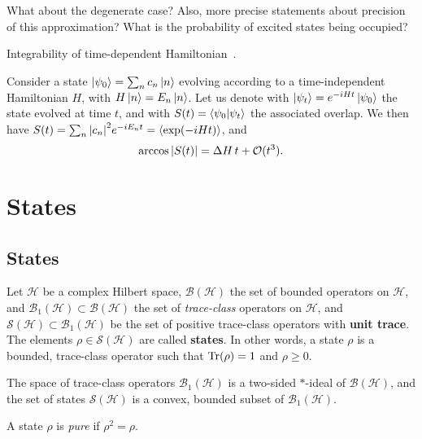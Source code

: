\documentclass[a4paper]{report}
\newcommand{\calB}{{\mathcal{B}}}
\newcommand{\calH}{{\mathcal{H}}}
\newcommand{\calS}{{\mathcal{S}}}
\begin{document}
\begin{question}
	What about the degenerate case? Also, more precise statements about precision of this approximation? What is the probability of excited states being occupied?
\end{question}

Integrability of time-dependent Hamiltonian~\autocite{sinitsyn2018integrable}.

\begin{prop}
	Consider a state $\ket{\psi_0}=\sum_n c_n \ket n$ evolving according to a time-independent Hamiltonian $H$, with $H\ket n=E_n \ket n$. Let us denote with $\ket{\psi_t}=e^{-iHt}\ket{\psi_0}$ the state evolved at time $t$, and with $S(t)=\braket{\psi_0}{\psi_t}$ the associated overlap.
	We then have $S(t)=\sum_n \abs{c_n}^2 e^{-iE_n t}=\expval{\exp(-iHt)}$, and
	\begin{equation}
		\arccos\abs{S(t)} = \Delta H\, t + \mathcal O(t^3).
	\end{equation}
\end{prop}

\chapter{States}

\section{States}
\begin{defn}[State]
	Let $\calH$ be a complex Hilbert space, $\calB(\calH)$ the set of bounded operators on $\calH$,
	and $\calB_1(\calH)\subset\calB(\calH)$ the set of \emph{trace-class} operators on $\calH$,
	and $\calS(\calH)\subset\calB_1(\calH)$ be the set of positive trace-class operators with \textbf{unit trace}.
	The elements $\rho\in\calS(\calH)$ are called \textbf{states}.
	In other words, a state $\rho$ is a bounded, trace-class operator such that
	$\Tr(\rho)=1$ and $\rho\ge0$.
\end{defn}

\begin{prop}
	The space of trace-class operators $\calB_1(\calH)$ is a two-sided $*$-ideal of $\calB(\calH)$, and the set of states $\calS(\calH)$ is a convex, bounded subset of $\calB_1(\calH)$.
\end{prop}

\begin{defn}
	A state $\rho$ is \emph{pure} if $\rho^2=\rho$.
\end{defn}
\end{document}

